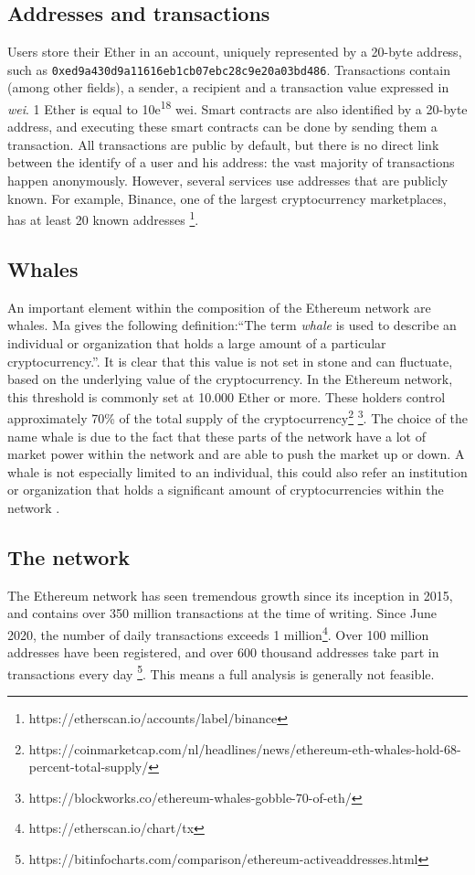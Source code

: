 \documentclass[10pt,a4paper]{article}
\begin{document}
\begin{multicols}{2}
\subsection{Addresses and transactions}
Users store their Ether in an account, uniquely represented by a 20-byte address, such as \texttt{0xed9a430d9a11616eb1cb07ebc28c9e20a03bd486}. Transactions contain (among other fields), a sender, a recipient and a transaction value expressed in \textit{wei}. 1 Ether is equal to 10e\textsuperscript{18} wei. Smart contracts are also identified by a 20-byte address, and executing these smart contracts can be done by sending them a transaction. All transactions are public by default, but there is no direct link between the identify of a user and his address: the vast majority of transactions happen anonymously. However, several services use addresses that are publicly known. For example, Binance, one of the largest cryptocurrency marketplaces, has at least 20 known addresses \footnote{https://etherscan.io/accounts/label/binance}.
\subsection{Whales}
An important element within the composition of the Ethereum network are whales. Ma \cite{ma} gives the following definition:“The term \textit {whale} is used to describe an individual or organization that holds a large amount of a particular cryptocurrency.”. It is clear that this value is not set in stone and can fluctuate, based on the underlying value of the cryptocurrency. In the Ethereum network, this threshold is commonly set at 10.000 Ether or more. These holders control approximately 70\% of the total supply of the cryptocurrency\footnote {https://coinmarketcap.com/nl/headlines/news/ethereum-eth-whales-hold-68-percent-total-supply/} \footnote {https://blockworks.co/ethereum-whales-gobble-70-of-eth/}. The choice of the name whale is due to the fact that these parts of the network have a lot of market power within the network and are able to push the market up or down. A whale is not especially limited to an individual, this could also refer an institution or organization that holds a significant amount of cryptocurrencies within the network \cite{ma}.


\subsection{The network}
The Ethereum network has seen tremendous growth since its inception in 2015, and contains over 350 million transactions at the time of writing. Since June 2020, the number of daily transactions exceeds 1 million\footnote{https://etherscan.io/chart/tx}. Over 100 million addresses have been registered, and over 600 thousand addresses take part in transactions every day \footnote{https://bitinfocharts.com/comparison/ethereum-activeaddresses.html}. This means a full analysis is generally not feasible.


\end{multicols}
\end{document}
